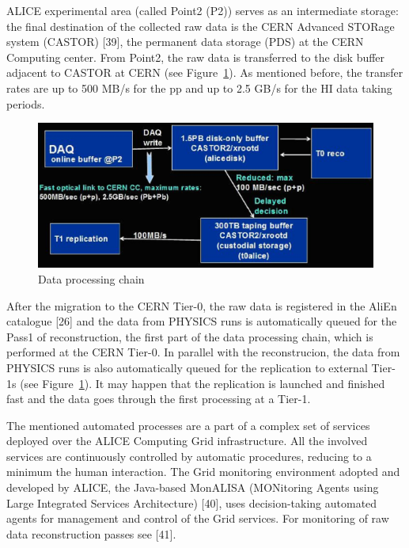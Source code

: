 ALICE experimental area (called Point2 (P2)) serves as an
intermediate storage: the final destination of the collected raw
data is the CERN Advanced STORage system (CASTOR) [39], the permanent
data storage (PDS) at the CERN Computing center. From Point2, the
raw data is transferred to the disk buffer adjacent to CASTOR at
CERN (see Figure~\ref{fig11}). As mentioned before, the transfer
rates are up to 500 MB/s for the pp and up to 2.5 GB/s for the HI
data taking periods.

\begin{figure}[htb] %
\centering
\includegraphics[width=13cm]{fig11.eps} %
\caption{Data processing chain}\label{fig11}
\end{figure}



After the migration to the CERN Tier-0, the raw data is registered
in the AliEn catalogue [26] and the data from PHYSICS runs is
automatically queued for the Pass1 of reconstruction, the first part
of the data processing chain, which is performed at the CERN Tier-0.
In parallel with the reconstrucion, the data from PHYSICS runs is also
automatically queued for the replication to external Tier-1s (see
Figure~\ref{fig11}). It may happen that the replication is launched
and finished fast and the data goes through the first processing at
a Tier-1.

The mentioned automated processes are a part of a complex set of
services deployed over the ALICE Computing Grid infrastructure. All
the involved services are continuously controlled by automatic
procedures, reducing to a minimum the human interaction. The Grid
monitoring environment adopted and developed by ALICE, the
Java-based MonALISA (MONitoring Agents using Large Integrated
Services Architecture) [40], uses decision-taking automated agents
for management and control of the Grid services. For monitoring of
raw data reconstruction passes see [41].

